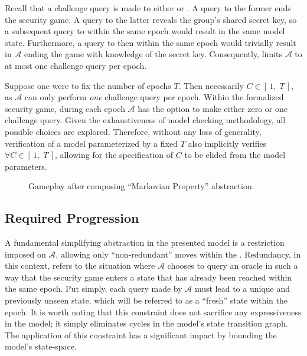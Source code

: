 \documentclass[authordraft,sigconf]{acmart}
\newcommand{\Adversary}{\ensuremath{\mathcal{A}}\xspace}
\newcommand{\NumericRange}[2]{\ensuremath{\left[\,#1,\; #2\,\right]}\xspace}
\begin{document}
Recall that a challenge query is made to either  or .
A query to the former ends the security game.
A query to the latter reveals the group's shared secret key, so a subsequent query to  within the same epoch would result in the same model state.
Furthermore, a query to  then  within the same epoch would trivially result in \Adversary ending the game with knowledge of the secret key.
Consequently, \CGKAsec limits \Adversary to at most one challenge query per epoch.

Suppose one were to fix the number of epochs $T$.
Then necessarily $C \in \NumericRange{1}{T}$, as \Adversary can only perform \emph{one} challenge query per epoch.
Within the formalized security game, during each epoch \Adversary has the option to make either zero or one challenge query.
Given the exhaustiveness of model checking methodology, all possible choices are explored.
Therefore, without any loss of generality, verification of a model parameterized by a fixed $T$ also implicitly verifies $\forall C \in \NumericRange{1}{T}$, allowing for the specification of $C$ to be elided from the model parameters.

\begin{figure*}[h!]
\centering
{}
\caption[Transition graph of informal CGKA definition]{%
\label{fig:CGKA-Progressing}%
Gameplay after composing ``Required Progression'' abstraction.%
}\vfill%
\caption[Transition graph of informal CGKA definition]{%
\label{fig:CGKA-Markovian}%
Gameplay after composing ``Markovian Property'' abstraction.%
}%
\end{figure*}

\subsection{Required Progression\label{sec:abstraction-progression}}

A fundamental simplifying abstraction in the presented model is a restriction imposed on \Adversary, allowing only ``non-redundant'' moves within the \CGKAsec.
Redundancy, in this context, refers to the situation where \Adversary chooses to query an oracle in such a way that the security game enters a state that has already been reached within the same epoch.
Put simply, each query made by \Adversary must lead to a unique and previously unseen state, which will be referred to as a ``fresh'' state within the epoch.
It is worth noting that this constraint does not sacrifice any expressiveness in the model; it simply eliminates cycles in the model's state transition graph.
The application of this constraint has a significant impact by bounding the model's state-space.
\end{document}
